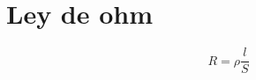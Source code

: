 \documentclass[spanish,openany]{report}
\date{\today}
\begin{document}

%
%
%


\section*{Ley de ohm \SIUnitSymbolOhm }
\[
	R  =  \rho \frac{l}{S} 
\]




\end{document}
